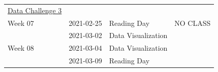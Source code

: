 \documentclass[
]{book}
\begin{document}
\begin{longtable}[]{@{}llll@{}}
\begin{minipage}[t]{0.22\columnwidth}
\href{https://classroom.github.com/a/DtxQhRcW}{Data Challenge 3}\strut
\end{minipage}\tabularnewline
\begin{minipage}[t]{0.22\columnwidth}\raggedright
Week 07\strut
\end{minipage} & \begin{minipage}[t]{0.22\columnwidth}\raggedright
2021-02-25\strut
\end{minipage} & \begin{minipage}[t]{0.22\columnwidth}\raggedright
Reading Day\strut
\end{minipage} & \begin{minipage}[t]{0.22\columnwidth}\raggedright
NO CLASS\strut
\end{minipage}\tabularnewline
\begin{minipage}[t]{0.22\columnwidth}\raggedright
\strut
\end{minipage} & \begin{minipage}[t]{0.22\columnwidth}\raggedright
2021-03-02\strut
\end{minipage} & \begin{minipage}[t]{0.22\columnwidth}\raggedright
Data Visualization\strut
\end{minipage} & \begin{minipage}[t]{0.22\columnwidth}\raggedright
\strut
\end{minipage}\tabularnewline
\begin{minipage}[t]{0.22\columnwidth}\raggedright
Week 08\strut
\end{minipage} & \begin{minipage}[t]{0.22\columnwidth}\raggedright
2021-03-04\strut
\end{minipage} & \begin{minipage}[t]{0.22\columnwidth}\raggedright
Data Visualization\strut
\end{minipage} & \begin{minipage}[t]{0.22\columnwidth}\raggedright
\strut
\end{minipage}\tabularnewline
\begin{minipage}[t]{0.22\columnwidth}\raggedright
\strut
\end{minipage} & \begin{minipage}[t]{0.22\columnwidth}\raggedright
2021-03-09\strut
\end{minipage} & \begin{minipage}[t]{0.22\columnwidth}\raggedright
Reading Day\strut
\end{minipage} & \begin{minipage}[t]{0.22\columnwidth}\raggedright

\end{minipage}
\end{longtable}
\end{document}
